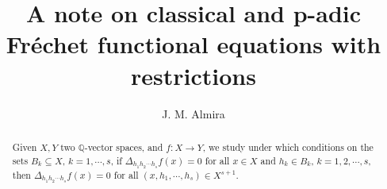 \documentclass[12pt,a4paper]{amsart}
\author{J. M. Almira}
\title{A note on classical and p-adic Fr\'{e}chet functional equations with restrictions}
\theoremstyle{definition}
\begin{document}

\begin{abstract} Given $X,Y$ two $\mathbb{Q}$-vector spaces, and $f:X\to Y$, we study under which conditions on the sets $B_k\subseteq X$, $k=1,\cdots,s$, if  $\Delta_{h_1h_2\cdots h_s}f(x)=0$ for all $x\in X$ and $h_k\in B_k$, $k=1,2,\cdots,s$, then $\Delta_{h_1h_2\cdots h_s}f(x)=0$ for all $(x,h_1,\cdots,h_s)\in X^{s+1}$.
\end{abstract}

\maketitle

\end{document}

